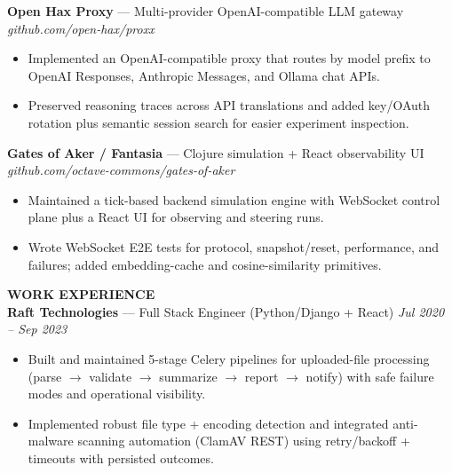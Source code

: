 \documentclass[10pt]{article}
\begin{document}
\textbf{Open Hax Proxy} --- Multi-provider OpenAI-compatible LLM gateway \hfill \textit{github.com/open-hax/proxx}\\
\vspace{-6pt}
\begin{itemize}
  \setlength\itemsep{-2pt}
  \setlength\parskip{0pt}
  \setlength\parsep{0pt}
  \item Implemented an OpenAI-compatible proxy that routes by model prefix to OpenAI Responses, Anthropic Messages, and Ollama chat APIs.
  \item Preserved reasoning traces across API translations and added key/OAuth rotation plus semantic session search for easier experiment inspection.
\end{itemize}

\textbf{Gates of Aker / Fantasia} --- Clojure simulation + React observability UI \hfill \textit{github.com/octave-commons/gates-of-aker}\\
\vspace{-6pt}
\begin{itemize}
  \setlength\itemsep{-2pt}
  \setlength\parskip{0pt}
  \setlength\parsep{0pt}
  \item Maintained a tick-based backend simulation engine with WebSocket control plane plus a React UI for observing and steering runs.
  \item Wrote WebSocket E2E tests for protocol, snapshot/reset, performance, and failures; added embedding-cache and cosine-similarity primitives.
\end{itemize}

\vspace{4pt}
\textbf{WORK EXPERIENCE}\\

\textbf{Raft Technologies} --- Full Stack Engineer (Python/Django + React) \hfill \textit{Jul 2020 -- Sep 2023}\\
\vspace{-6pt}
\begin{itemize}
  \setlength\itemsep{-2pt}
  \setlength\parskip{0pt}
  \setlength\parsep{0pt}
  \item Built and maintained 5-stage Celery pipelines for uploaded-file processing (parse $\rightarrow$ validate $\rightarrow$ summarize $\rightarrow$ report $\rightarrow$ notify) with safe failure modes and operational visibility.
  \item Implemented robust file type + encoding detection and integrated anti-malware scanning automation (ClamAV REST) using retry/backoff + timeouts with persisted outcomes.
\end{itemize}
\end{document}
